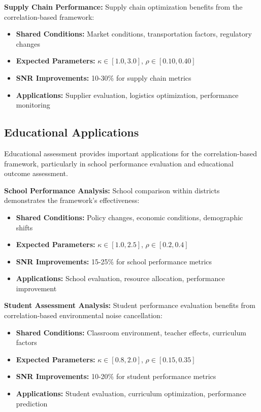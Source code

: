 \textbf{Supply Chain Performance:}
Supply chain optimization benefits from the correlation-based framework:
\begin{itemize}
    \item \textbf{Shared Conditions:} Market conditions, transportation factors, regulatory changes
    \item \textbf{Expected Parameters:} $\kappa \in [1.0, 3.0]$, $\rho \in [0.10, 0.40]$
    \item \textbf{SNR Improvements:} 10-30\% for supply chain metrics
    \item \textbf{Applications:} Supplier evaluation, logistics optimization, performance monitoring
\end{itemize}

\subsection{Educational Applications}

Educational assessment provides important applications for the correlation-based framework, particularly in school performance evaluation and educational outcome assessment.

\textbf{School Performance Analysis:}
School comparison within districts demonstrates the framework's effectiveness:
\begin{itemize}
    \item \textbf{Shared Conditions:} Policy changes, economic conditions, demographic shifts
    \item \textbf{Expected Parameters:} $\kappa \in [1.0, 2.5]$, $\rho \in [0.2, 0.4]$
    \item \textbf{SNR Improvements:} 15-25\% for school performance metrics
    \item \textbf{Applications:} School evaluation, resource allocation, performance improvement
\end{itemize}

\textbf{Student Assessment Analysis:}
Student performance evaluation benefits from correlation-based environmental noise cancellation:
\begin{itemize}
    \item \textbf{Shared Conditions:} Classroom environment, teacher effects, curriculum factors
    \item \textbf{Expected Parameters:} $\kappa \in [0.8, 2.0]$, $\rho \in [0.15, 0.35]$
    \item \textbf{SNR Improvements:} 10-20\% for student performance metrics
    \item \textbf{Applications:} Student evaluation, curriculum optimization, performance prediction
\end{itemize}

